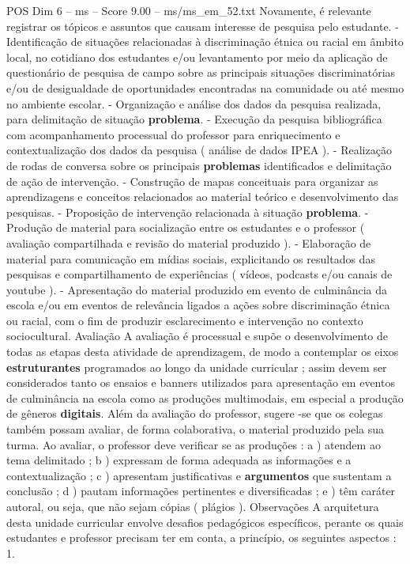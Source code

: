\begin{textsample}{POS Dim 6 – ms – Score 9.00 – ms/ms\_em\_52.txt}
Novamente, é relevante registrar os tópicos e assuntos que causam interesse de pesquisa pelo estudante. - Identificação de situações relacionadas à discriminação étnica ou racial em âmbito local, no cotidiano dos estudantes e/ou levantamento por meio da aplicação de questionário de pesquisa de campo sobre as principais situações discriminatórias e/ou de desigualdade de oportunidades encontradas na comunidade ou até mesmo no ambiente escolar. - Organização e análise dos dados da pesquisa realizada, para delimitação de situação \textbf{problema}. - Execução da pesquisa bibliográfica com acompanhamento processual do professor para enriquecimento e contextualização dos dados da pesquisa ( análise de dados IPEA ). - Realização de rodas de conversa sobre os principais \textbf{problemas} identificados e delimitação de ação de intervenção. - Construção de mapas conceituais para organizar as aprendizagens e conceitos relacionados ao material teórico e desenvolvimento das pesquisas. - Proposição de intervenção relacionada à situação \textbf{problema}. - Produção de material para socialização entre os estudantes e o professor ( avaliação compartilhada e revisão do material produzido ). - Elaboração de material para comunicação em mídias sociais, explicitando os resultados das pesquisas e compartilhamento de experiências ( vídeos, podcasts e/ou canais de youtube ). - Apresentação do material produzido em evento de culminância da escola e/ou em eventos de relevância ligados a ações sobre discriminação étnica ou racial, com o fim de produzir esclarecimento e intervenção no contexto sociocultural.
Avaliação A avaliação é processual e supõe o desenvolvimento de todas as etapas desta atividade de aprendizagem, de modo a contemplar os eixos \textbf{estruturantes} programados ao longo da unidade curricular ; assim devem ser considerados tanto os ensaios e banners utilizados para apresentação em eventos de culminância na escola como as produções multimodais, em especial a produção de gêneros \textbf{digitais}.
Além da avaliação do professor, sugere -se que os colegas também possam avaliar, de forma colaborativa, o material produzido pela sua turma.
Ao avaliar, o professor deve verificar se as produções : a ) atendem ao tema delimitado ; b ) expressam de forma adequada as informações e a contextualização ; c ) apresentam justificativas e \textbf{argumentos} que sustentam a conclusão ; d ) pautam informações pertinentes e diversificadas ; e ) têm caráter autoral, ou seja, que não sejam cópias ( plágios ).
Observações A arquitetura desta unidade curricular envolve desafios pedagógicos específicos, perante os quais estudantes e professor precisam ter em conta, a princípio, os seguintes aspectos : 1.

\end{textsample}
